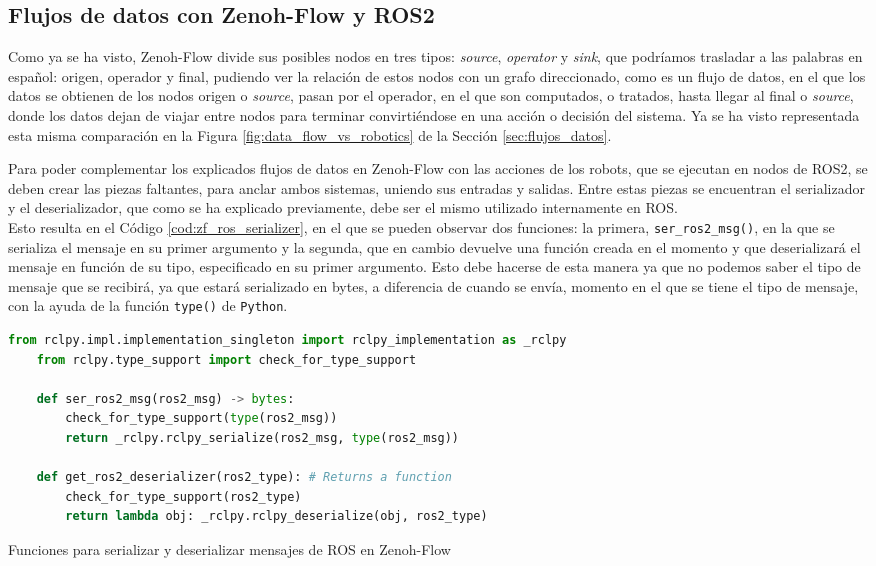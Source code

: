 \subsection{Flujos de datos con Zenoh-Flow y ROS2}
\label{sec:zf_ros}
Como ya se ha visto, Zenoh-Flow divide sus posibles nodos en tres tipos:
\textit{source}, \textit{operator} y \textit{sink}, que podríamos trasladar a
las palabras en español: origen, operador y final, pudiendo ver la relación de
estos nodos con un grafo direccionado, como es un flujo de datos, en el que
los datos se obtienen de los nodos origen o \textit{source}, pasan por el
operador, en el que son computados, o tratados, hasta llegar al final o
\textit{source}, donde los datos dejan de viajar entre nodos para terminar
convirtiéndose en una acción o decisión del sistema.
Ya se ha visto representada esta misma comparación en la Figura
\ref{fig:data_flow_vs_robotics} de la Sección \ref{sec:flujos_datos}.

Para poder complementar los explicados flujos de datos en Zenoh-Flow con las
acciones de los robots, que se ejecutan en nodos de ROS2, se deben crear las
piezas faltantes, para anclar ambos sistemas, uniendo sus entradas y salidas.
Entre estas piezas se encuentran el serializador y el deserializador, que como
se ha explicado previamente, debe ser el mismo utilizado internamente en ROS.
\\

Esto resulta en el Código \ref{cod:zf_ros_serializer}, en el que se pueden
observar dos funciones: la primera, \verb|ser_ros2_msg()|, en la que se
serializa el mensaje en su primer argumento y la segunda, que en cambio devuelve
una función creada en el momento y que deserializará el mensaje en función de su
tipo, especificado en su primer argumento.
Esto debe hacerse de esta manera ya que no podemos saber el tipo de mensaje que
se recibirá, ya que estará serializado en bytes, a diferencia de cuando se
envía, momento en el que se tiene el tipo de mensaje, con la ayuda de la función
\verb|type()| de \texttt{Python}.
\\

\begin{code}[H]
  \begin{lstlisting}[language=Python]
    from rclpy.impl.implementation_singleton import rclpy_implementation as _rclpy
    from rclpy.type_support import check_for_type_support

    def ser_ros2_msg(ros2_msg) -> bytes:
        check_for_type_support(type(ros2_msg))
        return _rclpy.rclpy_serialize(ros2_msg, type(ros2_msg))

    def get_ros2_deserializer(ros2_type): # Returns a function
        check_for_type_support(ros2_type)
        return lambda obj: _rclpy.rclpy_deserialize(obj, ros2_type)
  \end{lstlisting}
\caption[Funciones para serializar y deserializar mensajes de ROS en Zenoh-Flow]{Funciones para serializar y deserializar mensajes de ROS en Zenoh-Flow}
\label{cod:zf_ros_serializer}
\end{code}

